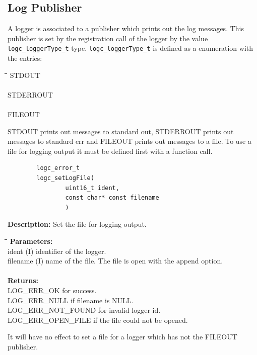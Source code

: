 \documentclass[a4paper, titlepage, 11pt]{article}
\begin{document}
\newpage

\subsection{Log Publisher}
A logger is associated to a publisher which prints out the log messages. This publisher is set by the registration call of the logger by the value \small\verb+logc_loggerType_t+ \normalsize type.\newline\newline
\small\verb+logc_loggerType_t+ \normalsize is defined as a enumeration with the entries:
\begin{tabbing}
\hspace*{1cm}\=\hspace*{2cm}\=\hspace*{0,6cm}\= \kill
\> STDOUT \\ \\
\> STDERROUT \\ \\
\> FILEOUT \\
\end{tabbing}
STDOUT prints out messages to standard out, STDERROUT prints out messages to standard err and FILEOUT prints out messages to a file. To use a file for logging output it must be defined first with a function call.
\small
\begin{verbatim}
        logc_error_t
        logc_setLogFile(
                uint16_t ident,
                const char* const filename
                )
\end{verbatim}
\normalsize
\textbf{Description:} Set the file for logging output.
\begin{tabbing}
\hspace*{1cm}\=\hspace*{2cm}\=\hspace*{0,6cm}\= \kill
\textbf{Parameters:} \\
\> ident \> (I) identifier of the logger. \\
\> filename \> (I) name of the file. The file is open with the append option. \\ \\
\textbf{Returns:} \\
\> LOG\_ERR\_OK for success. \\
\> LOG\_ERR\_NULL if filename is NULL. \\
\> LOG\_ERR\_NOT\_FOUND for invalid logger id. \\
\> LOG\_ERR\_OPEN\_FILE if the file could not be opened. \\
\end{tabbing}
It will have no effect to set a file for a logger which has not the FILEOUT publisher.
\end{document}
